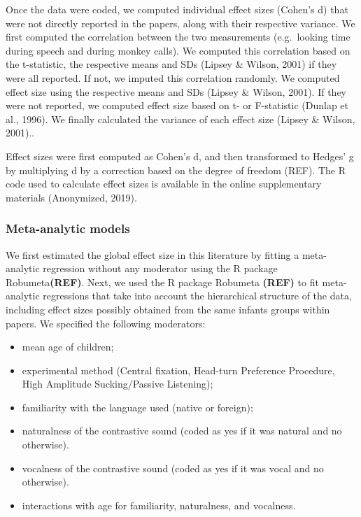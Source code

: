 \documentclass[man]{apa6}
\providecommand{\tightlist}{%
  \setlength{\itemsep}{0pt}\setlength{\parskip}{0pt}}
\begin{document}
Once the data were coded, we computed individual effect sizes (Cohen's
d) that were not directly reported in the papers, along with their
respective variance. We first computed the correlation between the two
measurements (e.g.~looking time during speech and during monkey calls).
We computed this correlation based on the t-statistic, the respective
means and SDs (Lipsey \& Wilson, 2001) if they were all reported. If
not, we imputed this correlation randomly. We computed effect size using
the respective means and SDs (Lipsey \& Wilson, 2001). If they were not
reported, we computed effect size based on t- or F-statistic (Dunlap et
al., 1996). We finally calculated the variance of each effect size
(Lipsey \& Wilson, 2001)..

Effect sizes were first computed as Cohen's d, and then transformed to
Hedges' g by multiplying d by a correction based on the degree of
freedom (REF). The R code used to calculate effect sizes is available in
the online supplementary materials (Anonymized, 2019).

\subsubsection{Meta-analytic models}\label{meta-analytic-models}

We first estimated the global effect size in this literature by fitting
a meta-analytic regression without any moderator using the R package
Robumeta\textbf{(REF)}. Next, we used the R package Robumeta
\textbf{(REF)} to fit meta-analytic regressions that take into account
the hierarchical structure of the data, including effect sizes possibly
obtained from the same infants groups within papers. We specified the
following moderators:

\begin{itemize}
\tightlist
\item
  mean age of children;
\item
  experimental method (Central fixation, Head-turn Preference Procedure,
  High Amplitude Sucking/Passive Listening);
\item
  familiarity with the language used (native or foreign);
\item
  naturalness of the contrastive sound (coded as yes if it was natural
  and no otherwise).
\item
  vocalness of the contrastive sound (coded as yes if it was vocal and
  no otherwise).
\item
  interactions with age for familiarity, naturalness, and vocalness.
\end{itemize}
\end{document}
